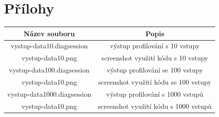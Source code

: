 \documentclass{article}
\begin{document}
\section{Přílohy}
\begin{tabular}[pos]{ | c | c |}
\hline
Název souboru & Popis \\
\hline
vystup-data10.diagsession & výstup profilování s 10 vstupy \\
vystup-data10.png & screenshot využití kódu s 10 vstupy \\
\hline
vystup-data100.diagsession & výstup profilování se 100 vstupy \\
vystup-data10.png & screenshot využití kódu se 100 vstupy \\
\hline
vystup-data1000.diagsession & výstup profilování s 1000 vstupů \\
vystup-data10.png & screenshot využití kódu s 1000 vstupů \\
\hline
\end{tabular}
\end{document}
